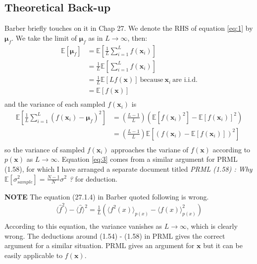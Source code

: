 \documentclass[a4]{article}
\begin{document}
\subsection{Theoretical Back-up}
Barber \cite{Barber2011} briefly touches on it in Chap 27.
We denote the RHS of equation \ref{eq:1} by $\bm{\mu}_f$.
We take the limit of $\bm{\mu}_f$ as in $L\rightarrow \infty$, then:
\begin{equation}
\begin{aligned}
\mathbb{E}\left[\bm{\mu}_f\right]
&=
\mathbb{E}\left[\frac{1}{L}\sum_{i=1}^{L}f(\bm{x}_i)\right]\\
&= \frac{1}{L}\mathbb{E}\left[\sum_{i=1}^{L}f(\bm{x}_i)\right]\\
&= \frac{1}{L}\mathbb{E}\left[L f(\bm{x})\right]
\:\text{because}\:\bm{x}_i\:\text{are i.i.d.}\\
&= \mathbb{E}\left[f(\bm{x})\right]\\
\end{aligned}
\end{equation}
and the variance of each sampled $f(\bm{x}_i)$ is
\begin{equation}
\begin{aligned}
\mathbb{E}\left[
    \frac{1}{L}\sum_{i=1}^{L}\left( f(\bm{x}_i) - \bm{\mu}_f \right)^2
\right]
&= \left( \frac{L - 1}{L} \right)
\left( \mathbb{E}\left[ f(\bm{x}_i)^2 \right] - 
       \mathbb{E}\left[ f(\bm{x}_i) \right]^2 \right)\\
&= \left( \frac{L - 1}{L} \right)\mathbb{E}\left[
\left( f(\bm{x}_i) - \mathbb{E}\left[ f(\bm{x}_i) \right] \right)^2
\right]\label{eq:3}\\
\end{aligned}
\end{equation}
so the variance of sampled $f(\bm{x}_i)$ approaches the variane of $f(\bm{x})$
according to $p(\bm{x})$ as $L\rightarrow \infty$.
Equation \ref{eq:3} comes from a similar argument for PRML \cite{bishop2007} (1.58), for which
I have arranged a separate document titled \textit{PRML (1.58) : Why $\mathbb{E}[\sigma_{sample}^2] = \frac{N-1}{N}\sigma^2$ ?} for deduction.

\textbf{NOTE} The equation (27.1.4) in Barber \cite{Barber2011} quoted following is wrong.
\begin{equation}
\begin{aligned}
\langle \hat{f}^2 \rangle - \langle \hat{f} \rangle^2 = \frac{1}{L}
\left( \langle f^2(x)\rangle_{p(x)} - \langle f(x) \rangle^2_{p(x)} \right)\\
\end{aligned}
\end{equation}
According to this equation, the variance vanishes as $L\rightarrow \infty$, which is
clearly wrong. The deductions around (1.54) - (1.58) in PRML\cite{bishop2007} gives the correct argument
for a similar situation. PRML gives an argument for $\bm{x}$ but it can be easily applicable
to $f(\bm{x})$.
\end{document}
